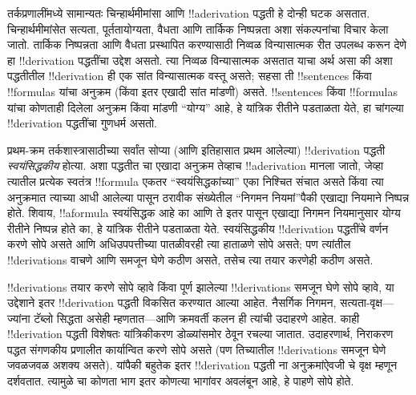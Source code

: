\documentclass[../../../include/open-logic-section]{subfiles}
\begin{document}
      {}
      {}


तर्कप्रणालींमध्ये सामान्यतः चिन्हार्थमीमांसा आणि !!a{derivation}
पद्धती हे दोन्ही घटक असतात. चिन्हार्थमीमांसेत सत्यता, पूर्ततायोग्यता,
वैधता आणि तार्किक निष्पन्नता अशा संकल्पनांचा विचार केला जातो.
तार्किक निष्पन्नता आणि वैधता प्रस्थापित करण्यासाठी निव्वळ विन्यासात्मक
रीत उपलब्ध करून देणे हा !!{derivation} पद्धतींचा उद्देश असतो. त्या
निव्वळ विन्यासात्मक असतात याचा अर्थ असा की अशा पद्धतीतील
!!{derivation} ही एक सांत विन्यासात्मक वस्तू असते; सहसा ती
!!{sentence}s किंवा !!{formula}s यांचा अनुक्रम (किंवा इतर एखादी सांत
मांडणी) असते. !!{sentence}s किंवा !!{formula}s यांचा कोणताही दिलेला
अनुक्रम किंवा मांडणी ``योग्य'' आहे, हे यांत्रिक रीतीने पडताळता येते,
हा चांगल्या !!{derivation} पद्धतींचा गुणधर्म असतो.

प्रथम-क्रम तर्कशास्त्रासाठीच्या सर्वांत सोप्या (आणि इतिहासात प्रथम
आलेल्या) !!{derivation} पद्धती \emph{स्वयंसिद्धकीय} होत्या. अशा
पद्धतीत चा एखादा अनुक्रम तेव्हाच !!a{derivation} मानला
जातो, जेव्हा त्यातील प्रत्येक स्वतंत्र !!{formula} एकतर
``स्वयंसिद्धकांच्या'' एका निश्चित संचात असते किंवा त्या अनुक्रमात
त्याच्या आधी आलेल्या पासून ठरावीक संख्येतील ``निगमन
नियमां''पैकी एखाद्या नियमाने निष्पन्न होते. शिवाय, !!a{formula}
स्वयंसिद्धक आहे का आणि ते इतर पासून एखाद्या निगमन
नियमानुसार योग्य रीतीने निष्पन्न होते का, हे यांत्रिक रीतीने पडताळता
येते. स्वयंसिद्धकीय !!{derivation} पद्धतींचे वर्णन करणे सोपे असते आणि
अधिउपपत्तीच्या पातळीवरही त्या हाताळणे सोपे असते; पण त्यांतील
!!{derivation}s वाचणे आणि समजून घेणे कठीण असते, तसेच त्या तयार करणेही
कठीण असते.

!!{derivation}s तयार करणे सोपे व्हावे किंवा पूर्ण झालेल्या
!!{derivation}s समजून घेणे सोपे व्हावे, या उद्देशाने इतर
!!{derivation} पद्धती विकसित करण्यात आल्या आहेत. नैसर्गिक निगमन,
सत्यता-वृक्ष---ज्यांना टॅब्लो सिद्धता असेही म्हणतात---आणि क्रमवर्ती कलन
ही त्यांची उदाहरणे आहेत. काही !!{derivation} पद्धती विशेषतः
यांत्रिकीकरण डोळ्यांसमोर ठेवून रचल्या जातात. उदाहरणार्थ, निराकरण पद्धत
संगणकीय प्रणालीत कार्यान्वित करणे सोपे असते (पण तिच्यातील
!!{derivation}s समजून घेणे जवळजवळ अशक्य असते). यांपैकी बहुतेक इतर
!!{derivation} पद्धती ना अनुक्रमांऐवजी चे
वृक्ष म्हणून दर्शवतात. त्यामुळे चा कोणता भाग इतर
कोणत्या भागांवर अवलंबून आहे, हे पाहणे सोपे होते.
\end{document}
